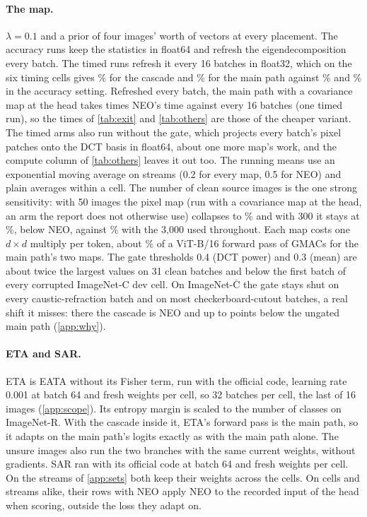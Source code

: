 \documentclass{article}
\newcommand{\neo}{NEO}
\begin{document}
\paragraph{The map.} $\lambda{=}0.1$ and a prior of four images' worth of vectors at every placement. The accuracy runs keep the statistics in float64 and refresh the eigendecomposition every batch. The timed runs refresh it every 16 batches in float32, which on the six timing cells gives \% for the cascade and \% for the main path against \% and \% in the accuracy setting. Refreshed every batch, the main path with a covariance map at the head takes  times \neo{}'s time against  every 16 batches (one timed run), so the times of \cref{tab:exit} and \cref{tab:others} are those of the cheaper variant. The timed arms also run without the gate, which projects every batch's pixel patches onto the DCT basis in float64, about one more map's work, and the compute column of \cref{tab:others} leaves it out too. The running means use an exponential moving average on streams (0.2 for every map, 0.5 for \neo{}) and plain averages within a cell. The number of clean source images is the one strong sensitivity: with 50 images the pixel map (run with a covariance map at the head, an arm the report does not otherwise use) collapses to \% and with 300 it stays at \%, below \neo{}, against \% with the 3{,}000 used throughout. Each map costs one $d{\times}d$ multiply per token, about \% of a ViT-B/16 forward pass of  GMACs for the main path's two maps. The gate thresholds 0.4 (DCT power) and 0.3 (mean) are about twice the largest values on 31 clean batches and below the first batch of every corrupted ImageNet-C dev cell. On ImageNet-$\overline{\text{C}}$ the gate stays shut on every caustic-refraction batch and on most checkerboard-cutout batches, a real shift it misses: there the cascade is \neo{} and up to  points below the ungated main path (\cref{app:why}).

\paragraph{ETA and SAR.} ETA is EATA without its Fisher term, run with the official code, learning rate 0.001 at batch 64 and fresh weights per cell, so 32 batches per cell, the last of 16 images (\cref{app:scope}). Its entropy margin is scaled to the number of classes on ImageNet-R. With the cascade inside it, ETA's forward pass is the main path, so it adapts on the main path's logits exactly as with the main path alone. The unsure images also run the two branches with the same current weights, without gradients. SAR ran with its official code at batch 64 and fresh weights per cell. On the streams of \cref{app:sets} both keep their weights across the cells. On cells and streams alike, their rows with \neo{} apply \neo{} to the recorded input of the head when scoring, outside the loss they adapt on.
\end{document}
